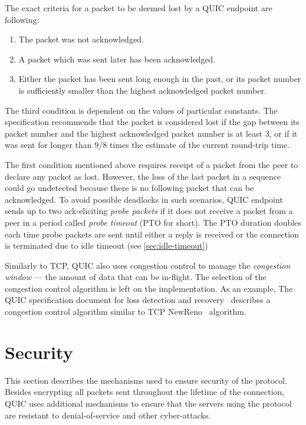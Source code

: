 The exact criteria for a packet to be deemed lost by a QUIC endpoint are following:

\begin{enumerate}

  \item The packet was not acknowledged.

  \item A packet which was sent later has been acknowledged.

  \item Either the packet has been sent long enough in the past, or its packet number is
sufficiently smaller than the highest acknowledged packet number.

\end{enumerate}

The third condition is dependent on the values of particular constants. The specification recommends
that the packet is considered lost if the gap between its packet number and the highest acknowledged
packet number is at least 3, or if it was sent for longer than $9/8$ times the estimate of the
current round-trip time.

The first condition mentioned above requires receipt of a packet from the peer to declare any packet
as lost. However, the loss of the last packet in a sequence could go undetected because there is no
following packet that can be acknowledged. To avoid possible deadlocks in such scenarios, QUIC
endpoint sends up to two ack-eliciting \textit{probe packets} if it does not receive a packet from a
peer in a period called \textit{probe timeout} (PTO for short). The PTO duration doubles each time
probe packets are sent until either a reply is received or the connection is terminated due to idle
timeout (see \autoref{sec:idle-timeout})

Similarly to TCP, QUIC also uses congestion control to manage the \textit{congestion window} --- the
amount of data that can be in-flight. The selection of the congestion control algorithm is left on
the implementation. As an example, The QUIC specification document for loss detection and recovery~\cite[Section~7]{draft-ietf-quic-recovery} describes a congestion control algorithm similar to TCP NewReno~\cite{rfc6582} algorithm.

\section{Security}

This section describes the mechanisms used to ensure security of the protocol. Besides encrypting
all packets sent throughout the lifetime of the connection, QUIC uses additional mechanisms to
ensure that the servers using the protocol are resistant to denial-of-service and other
cyber-attacks.

